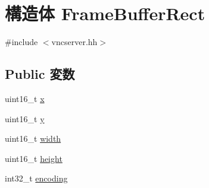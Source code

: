 \hypertarget{structVncServer_1_1FrameBufferRect}{
\section{構造体 FrameBufferRect}
\label{structVncServer_1_1FrameBufferRect}
}


{\ttfamily \#include $<$vncserver.hh$>$}\subsection*{Public 変数}
\begin{DoxyCompactItemize}
\item 
uint16\_\-t \hyperlink{structVncServer_1_1FrameBufferRect_a4dde988b1b2adba65ae3efa69f65d960}{x}
\item 
uint16\_\-t \hyperlink{structVncServer_1_1FrameBufferRect_ab0580f504a7428539be299fa71565f30}{y}
\item 
uint16\_\-t \hyperlink{structVncServer_1_1FrameBufferRect_ad0eab1042455a2067c812ab8071d5376}{width}
\item 
uint16\_\-t \hyperlink{structVncServer_1_1FrameBufferRect_a81c9f8d0b8c3b49d770be14dbe9f0d37}{height}
\item 
int32\_\-t \hyperlink{structVncServer_1_1FrameBufferRect_a18a7b605a2e8450803090da92cf2c034}{encoding}
\end{DoxyCompactItemize}


